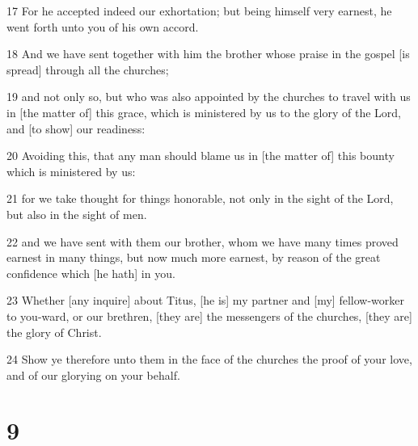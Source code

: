 \par 17 For he accepted indeed our exhortation; but being himself very earnest, he went forth unto you of his own accord.
\par 18 And we have sent together with him the brother whose praise in the gospel [is spread] through all the churches;
\par 19 and not only so, but who was also appointed by the churches to travel with us in [the matter of] this grace, which is ministered by us to the glory of the Lord, and [to show] our readiness:
\par 20 Avoiding this, that any man should blame us in [the matter of] this bounty which is ministered by us:
\par 21 for we take thought for things honorable, not only in the sight of the Lord, but also in the sight of men.
\par 22 and we have sent with them our brother, whom we have many times proved earnest in many things, but now much more earnest, by reason of the great confidence which [he hath] in you.
\par 23 Whether [any inquire] about Titus, [he is] my partner and [my] fellow-worker to you-ward, or our brethren, [they are] the messengers of the churches, [they are] the glory of Christ.
\par 24 Show ye therefore unto them in the face of the churches the proof of your love, and of our glorying on your behalf.

\chapter{9}

